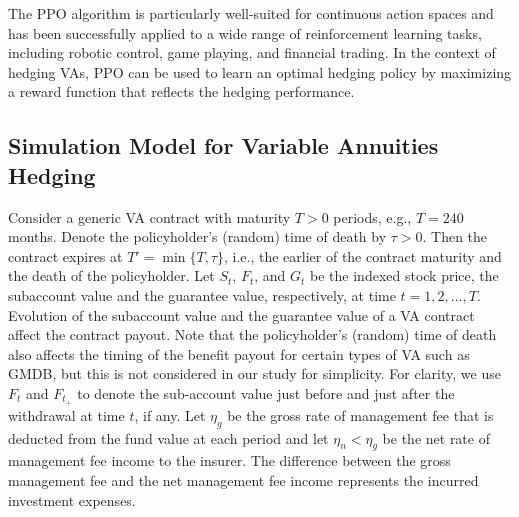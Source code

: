 The PPO algorithm is particularly well-suited for continuous action spaces and has been successfully applied to a wide range of reinforcement learning tasks, including robotic control, game playing, and financial trading.
In the context of hedging VAs, PPO can be used to learn an optimal hedging policy by maximizing a reward function that reflects the hedging performance.

\subsection{Simulation Model for Variable Annuities Hedging} \label{subsec:VASimulation}

Consider a generic VA contract with maturity $T>0$ periods, e.g., $T=240$ months.
Denote the policyholder's (random) time of death by $\tau>0$.
Then the contract expires at $T'=\min\{T,\tau\}$, i.e., the earlier of the contract maturity and the death of the policyholder.
Let $S_t$, $F_t$, and $G_t$ be the indexed stock price, the subaccount value and the guarantee value, respectively, at time $t=1,2,\ldots,T$.
Evolution of the subaccount value and the guarantee value of a VA contract affect the contract payout.
Note that the policyholder's (random) time of death also affects the timing of the benefit payout for certain types of VA such as GMDB, but this is not considered in our study for simplicity.
For clarity, we use $F_t$ and $F_{t_+}$ to denote the sub-account value just before and just after the withdrawal at time $t$, if any.
Let $\eta_g$ be the gross rate of management fee that is deducted from the fund value at each period and let $\eta_n < \eta_g$ be the net rate of management fee income to the insurer.
The difference between the gross management fee and the net management fee income represents the incurred investment expenses.

